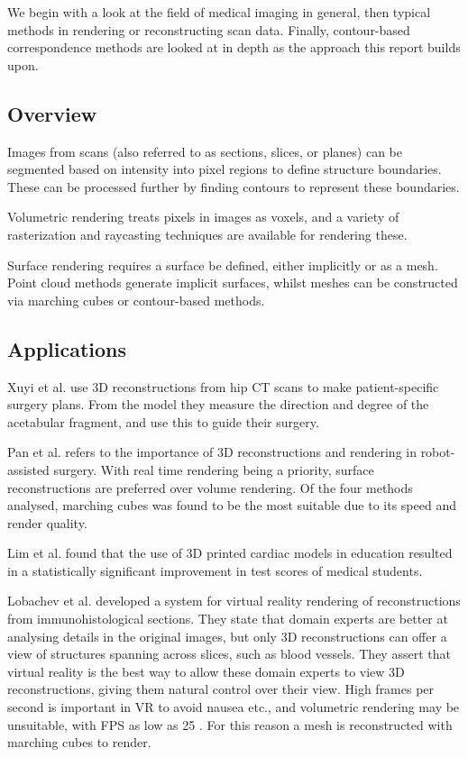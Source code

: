 \documentclass[11p, titlepage]{article}
\begin{document}
We begin with a look at the field of medical imaging in general, then typical methods in rendering or reconstructing scan data. Finally, contour-based correspondence methods are looked at in depth as the approach this report builds upon.

\subsection{Overview}

Images from scans (also referred to as sections, slices, or planes) can be segmented based on intensity into pixel regions to define structure boundaries. These can be processed further by finding contours to represent these boundaries.

Volumetric rendering treats pixels in images as voxels, and a variety of rasterization and raycasting techniques are available for rendering these.

Surface rendering requires a surface be defined, either implicitly or as a mesh. Point cloud methods generate implicit surfaces, whilst meshes can be constructed via marching cubes or contour-based methods.

\subsection{Applications}

Xuyi et al. \cite{xuyi2016application} use 3D reconstructions from hip CT scans to make patient-specific surgery plans. From the model they measure the direction and degree of the acetabular fragment, and use this to guide their surgery.

Pan et al. \cite{pan2017comparison} refers to the importance of 3D reconstructions and rendering in robot-assisted surgery. With real time rendering being a priority, surface reconstructions are preferred over volume rendering. Of the four methods analysed, marching cubes was found to be the most suitable due to its speed and render quality.

Lim et al. \cite{lim2016use} found that the use of 3D printed cardiac models in education resulted in a statistically significant improvement in test scores of medical students.

Lobachev et al. \cite{lobachev2021inspection} developed a system for virtual reality rendering of reconstructions from immunohistological sections. They state that domain experts are better at analysing details in the original images, but only 3D reconstructions can offer a view of structures spanning across slices, such as blood vessels. They assert that virtual reality is the best way to allow these domain experts to view 3D reconstructions, giving them natural control over their view. High frames per second is important in VR to avoid nausea etc., and volumetric rendering may be unsuitable, with FPS as low as 25 \cite{williams2019method}. For this reason a mesh is reconstructed with marching cubes to render.
\end{document}
